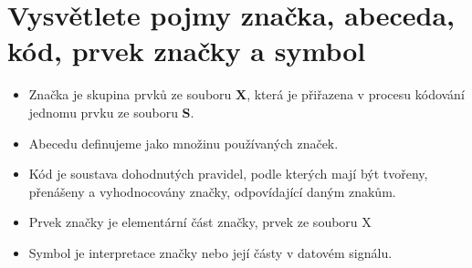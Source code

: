 \section{Vysvětlete pojmy značka, abeceda, kód, prvek značky a symbol}
\begin{itemize}
    \item Značka je skupina prvků ze souboru \textbf{X}, která je přiřazena v procesu kódování jednomu prvku ze souboru \textbf{S}.
    \item Abecedu definujeme jako množinu používaných značek.
    \item Kód je soustava dohodnutých pravidel, podle kterých mají být tvořeny, přenášeny a vyhodnocovány značky, odpovídající daným znakům.
    \item Prvek značky je elementární část značky, prvek ze souboru X
    \item Symbol je interpretace značky nebo její částy v datovém signálu.
\end{itemize}

